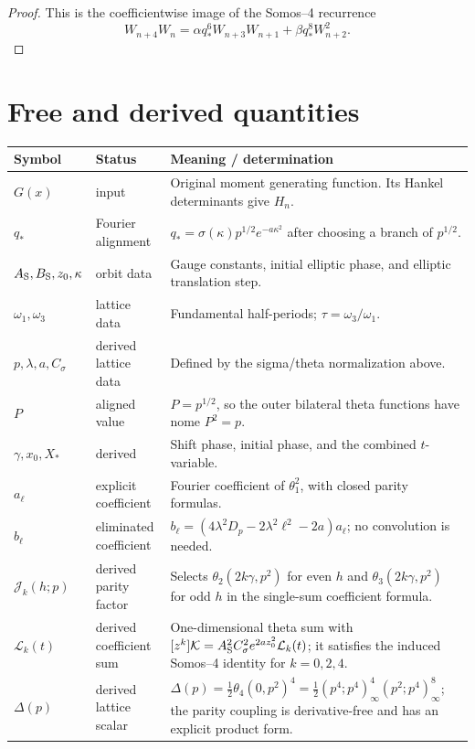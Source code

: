\documentclass[11pt]{article}
\numberwithin{equation}{section}
\newcommand{\Dp}{D_p}
\begin{document}
\begin{proof}
This is the coefficientwise image of the Somos--4 recurrence
\begin{equation}
W_{n+4}W_n=\alpha q_\ast^6W_{n+3}W_{n+1}
+\beta q_\ast^8W_{n+2}^2.
\end{equation}
\end{proof}
\section{Free and derived quantities}
\renewcommand{\arraystretch}{1.2}
\begin{longtable}{>{\raggedright\arraybackslash}p{}>{\raggedright\arraybackslash}p{}>{\raggedright\arraybackslash}p{}}
\toprule
Symbol & Status & Meaning / determination \\
\midrule
$G(x)$ & input & Original moment generating function. Its Hankel determinants give $H_n$.\\
$q_\ast$ & Fourier alignment & $q_\ast=\sigma(\kappa)p^{1/2}e^{-a\kappa^2}$ after choosing a branch of $p^{1/2}$.\\
$A_{\rm S},B_{\rm S},z_0,\kappa$ & orbit data & Gauge constants, initial elliptic phase, and elliptic translation step.\\
$\omega_1,\omega_3$ & lattice data & Fundamental half-periods; $\tau=\omega_3/\omega_1$.\\
$p,\lambda,a,C_\sigma$ & derived lattice data & Defined by the sigma/theta normalization above.\\
$P$ & aligned value & $P=p^{1/2}$, so the outer bilateral theta functions have nome $P^2=p$.\\
$\gamma,x_0,X_\ast$ & derived & Shift phase, initial phase, and the combined $t$-variable.\\
$a_\ell$ & explicit coefficient & Fourier coefficient of $\theta_1^2$, with closed parity formulas.\\
$b_\ell$ & eliminated coefficient & $b_\ell=(4\lambda^2\Dp-2\lambda^2\ell^2-2a)a_\ell$; no convolution is needed.\\
$\mathcal J_k(h;p)$ & derived parity factor & Selects $\theta_2(2k\gamma,p^2)$ for even $h$ and $\theta_3(2k\gamma,p^2)$ for odd $h$ in the single-sum coefficient formula.\\
$\mathcal L_k(t)$ & derived coefficient sum & One-dimensional theta sum with $[z^k]\mathcal K=A_{\rm S}^2C_\sigma^2e^{2az_0^2}\mathcal L_k(t)$; it satisfies the induced Somos--4 identity for $k=0,2,4$.\\
$\Delta(p)$ & derived lattice scalar & $\Delta(p)=\tfrac12\theta_4(0,p^2)^4=\tfrac12(p^4;p^4)_\infty^4(p^2;p^4)_\infty^8$; the parity coupling is derivative-free and has an explicit product form.\\
\bottomrule
\end{longtable}
\end{document}
